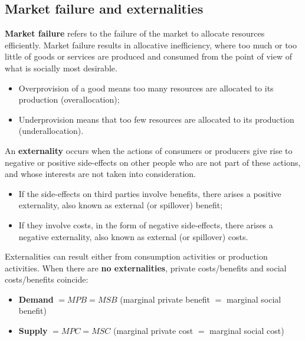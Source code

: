 \documentclass[a4paper,12pt]{article}
\newcommand{\needbold}[1]{\textcolor{red!70!black}{\textbf{#1}}}
\begin{document}
\subsection{Market failure and externalities}
\needbold{Market failure} refers to the failure of the market to allocate resources efficiently. Market failure results in allocative inefficiency, where too much or too little of goods or services are produced and consumed from the point of view of what is socially most desirable. 
\begin{itemize}
  \item Overprovision of a good means too many resources are allocated to its production (overallocation);
  \item Underprovision means that too few resources are allocated to its production (underallocation).
\end{itemize}
An \needbold{externality} occurs when the actions of consumers or producers give rise to negative or positive side-effects on other people who are not part of these actions, and whose interests are not taken into consideration. 
\begin{itemize}
  \item If the side-effects on third parties involve benefits, there arises a positive externality, also known as external (or spillover) benefit;
  \item If they involve costs, in the form of negative side-effects, there arises a negative externality, also known as external (or spillover) costs. 
\end{itemize} 
Externalities can result either from consumption activities or production activities.
When there are \textbf{no externalities}, private costs/benefits and social costs/benefits coincide:
\begin{itemize}
  \item \textbf{Demand} $= MPB = MSB$ (marginal private benefit $=$ marginal social benefit)
  \item \textbf{Supply} $= MPC = MSC$ (marginal private cost $=$ marginal social cost)
\end{itemize}
\end{document}
